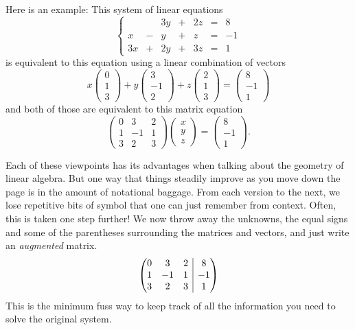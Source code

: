 \documentclass[10pt,]{book}
\makeatletter
\theoremstyle{plain}
\theoremstyle{definition}
\numberwithin{equation}{section}
\newcommand{\augmatrix}[2]{\left(\begin{array}{@{}#1 |c@{}} #2 \end{array}\right)}
\makeatother
\begin{document}
        Here is an example: This system of linear equations
        \[
          \left\{ \begin{array}{rrrrrrr}
              &  &3y &+ &2z &= &8 \\
            x &- & y &+ & z &= &-1 \\
          3 x &+ &2y &+ &3z &= &1
          \end{array}\right.
        \]
        is equivalent to this equation using a linear combination of vectors
        \[
        x \begin{pmatrix} 0 \\ 1 \\ 3 \end{pmatrix} +
        y \begin{pmatrix} 3 \\ -1 \\ 2 \end{pmatrix} +
        z \begin{pmatrix} 2 \\ 1 \\ 3 \end{pmatrix} =
        \begin{pmatrix} 8 \\ -1 \\ 1 \end{pmatrix}
        \]
        and both of those are equivalent to this matrix equation
        \[
          \begin{pmatrix} 0 &3 &2 \\ 1 &-1 &1 \\ 3 &2 &3
          \end{pmatrix} \begin{pmatrix} x \\ y \\ z \end{pmatrix} =
          \begin{pmatrix} 8 \\ -1 \\ 1 \end{pmatrix} .
        \]
\par

        Each of these viewpoints has its advantages when talking about the
        geometry of linear algebra. But one way that things steadily improve as
        you move down the page is in the amount of notational baggage.
        From each version to the next, we lose repetitive bits of symbol that
        one can just remember from context.
        Often, this is taken one step further! We now throw away the unknowns,
        the equal signs and some of the parentheses surrounding the matrices and
        vectors, and just write an \emph{augmented} matrix.
        \[
          \augmatrix{ccc}{
          0 &3 &2 &8\\ 1 &-1 &1 &-1\\ 3 &2 &3 &1
          }
        \]
        This is the minimum fuss way to keep track of all the information you
        need to solve the original system.
\typeout{************************************************}
\typeout{************************************************}
\end{document}
